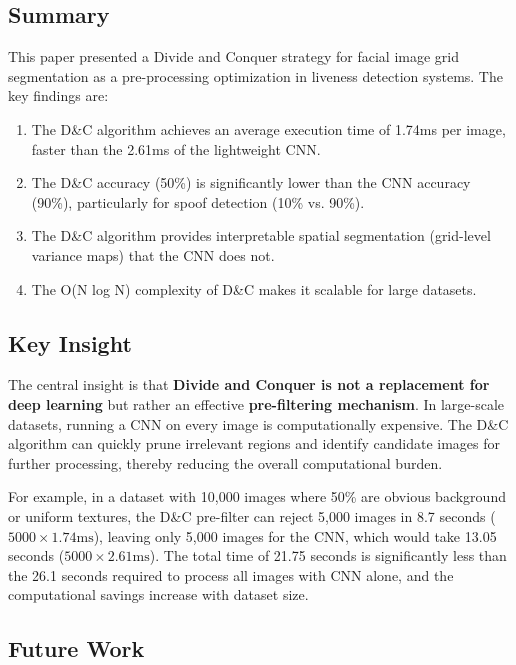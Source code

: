 \documentclass[conference]{IEEEtran}
\begin{document}
\subsection{Summary}

This paper presented a Divide and Conquer strategy for facial image grid segmentation as a pre-processing optimization in liveness detection systems. The key findings are:

\begin{enumerate}
    \item The D\&C algorithm achieves an average execution time of 1.74ms per image, faster than the 2.61ms of the lightweight CNN.
    \item The D\&C accuracy (50\%) is significantly lower than the CNN accuracy (90\%), particularly for spoof detection (10\% vs. 90\%).
    \item The D\&C algorithm provides interpretable spatial segmentation (grid-level variance maps) that the CNN does not.
    \item The O(N log N) complexity of D\&C makes it scalable for large datasets.
\end{enumerate}

\subsection{Key Insight}

The central insight is that \textbf{Divide and Conquer is not a replacement for deep learning} but rather an effective \textbf{pre-filtering mechanism}. In large-scale datasets, running a CNN on every image is computationally expensive. The D\&C algorithm can quickly prune irrelevant regions and identify candidate images for further processing, thereby reducing the overall computational burden.

For example, in a dataset with 10,000 images where 50\% are obvious background or uniform textures, the D\&C pre-filter can reject 5,000 images in 8.7 seconds ($5000 \times 1.74\text{ms}$), leaving only 5,000 images for the CNN, which would take 13.05 seconds ($5000 \times 2.61\text{ms}$). The total time of 21.75 seconds is significantly less than the 26.1 seconds required to process all images with CNN alone, and the computational savings increase with dataset size.

\subsection{Future Work}
\end{document}
